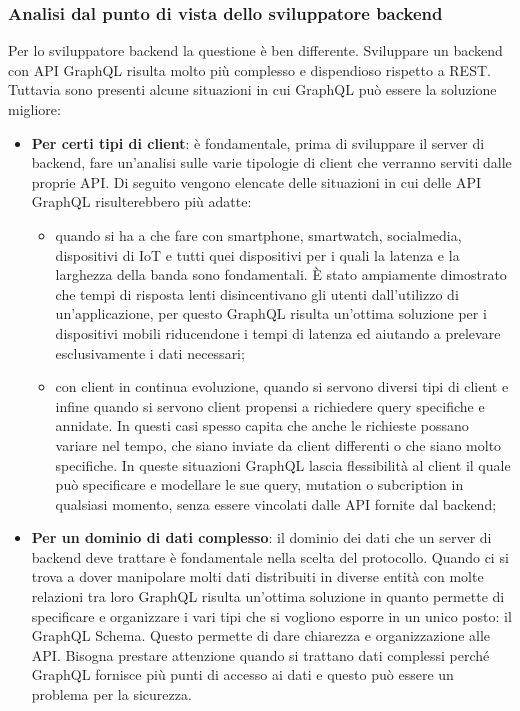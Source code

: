 \subsubsection*{Analisi dal punto di vista dello sviluppatore backend}
Per lo sviluppatore backend la questione è ben differente. Sviluppare un backend con API GraphQL risulta molto più complesso e dispendioso rispetto a REST. Tuttavia sono presenti alcune situazioni in cui GraphQL può essere la soluzione migliore:
\begin{itemize}
  \item \textbf{Per certi tipi di client}: è fondamentale, prima di sviluppare il server di backend, fare un'analisi sulle varie tipologie di client che verranno serviti dalle proprie API. Di seguito vengono elencate delle situazioni in cui delle API GraphQL risulterebbero più adatte:
  \begin{itemize}
    \item quando si ha a che fare con smartphone, smartwatch, socialmedia, dispositivi di IoT  e tutti quei dispositivi per i quali la latenza e la larghezza della banda sono fondamentali. È stato ampiamente dimostrato che tempi di risposta lenti disincentivano gli utenti dall'utilizzo di un'applicazione, per questo GraphQL risulta un'ottima soluzione per i dispositivi mobili riducendone i tempi di latenza ed aiutando a prelevare esclusivamente i dati necessari;
    \item con client in continua evoluzione, quando si servono diversi tipi di client e infine quando si servono client propensi a richiedere query specifiche e annidate. In questi casi spesso capita che anche le richieste possano variare nel tempo, che siano inviate da client differenti o che siano molto specifiche. In queste situazioni GraphQL lascia flessibilità al client il quale può specificare e modellare le sue query, mutation o subcription in qualsiasi momento, senza essere vincolati dalle API fornite dal backend;
  \end{itemize}
  \item \textbf{Per un dominio di dati complesso}: il dominio dei dati che un server di backend deve trattare è fondamentale nella scelta del protocollo. Quando ci si trova a dover manipolare molti dati distribuiti in diverse entità con molte relazioni tra loro GraphQL risulta un'ottima soluzione in quanto permette di specificare e organizzare i vari tipi che si vogliono esporre in un unico posto: il GraphQL Schema. Questo permette di dare chiarezza e organizzazione alle API. Bisogna prestare attenzione quando si trattano dati complessi perché GraphQL fornisce più punti di accesso ai dati e questo può essere un problema per la sicurezza.

\end{itemize}
